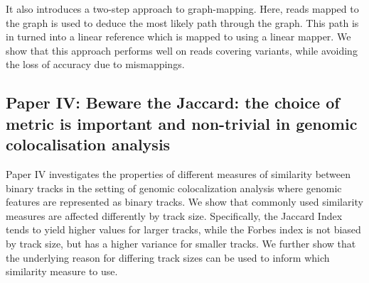 It also introduces a two-step approach to graph-mapping.
Here, reads mapped to the graph is used to deduce the most likely path through the graph.
This path is in turned into a linear reference which is mapped to using a linear mapper.
We show that this approach performs well on reads covering variants, while avoiding the loss of accuracy due to mismappings.

\subsection*{Paper IV: Beware the Jaccard: the choice of metric is important and non-trivial in genomic colocalisation analysis}
Paper IV investigates the properties of different measures of similarity between binary tracks in the setting of genomic colocalization analysis where genomic features are represented as binary tracks.
We show that commonly used similarity measures are affected differently by track size.
Specifically, the Jaccard Index tends to yield higher values for larger tracks, while the Forbes index is not biased by track size, but has a higher variance for smaller tracks. We further show that the underlying reason for differing track sizes can be used to inform which similarity measure to use.

